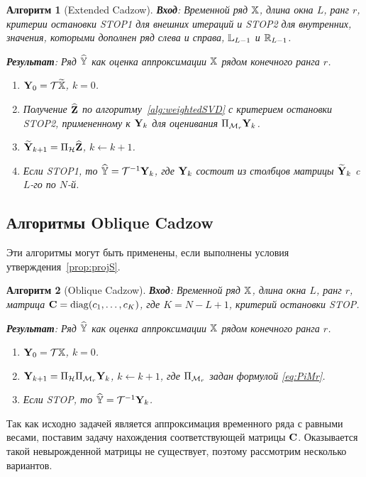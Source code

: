\documentclass[12pt,a4paper,fleqn,leqno]{article}
\newtheorem{algorithm}{Алгоритм}%
\begin{document}
\begin{algorithm}[Extended Cadzow]
\textbf{Вход}: Временной ряд $\mathbb{X}$, длина окна $L$, ранг $r$,
критерии остановки STOP1 для внешних итераций и STOP2 для внутренних,
значения, которыми дополнен ряд слева и справа, $\mathbb{L}_{L-1}$ и $\mathbb{R}_{L-1}$.

\textbf{Результат}:
Ряд $\widehat{\mathbb{Y}}$ как оценка аппроксимации $\mathbb{X}$ рядом конечного ранга $r$.

\begin{enumerate}
\item
$\mathbf{Y}_0 = \mathcal{T} \widetilde{\mathbb{X}}$, $k=0$.
\item
Получение $\widehat{\mathbf{Z}}$ по алгоритму~\ref{alg:weightedSVD} с критерием остановки STOP2, примененному к $\mathbf{Y}_k$ для оценивания $\Pi_{\mathcal{M}_r} \mathbf{Y}_{k}$.
\item
$\widetilde{\mathbf{Y}}_{k+1} = \Pi_{\mathcal{H}}  \widehat{\mathbf{Z}}$, $k\leftarrow k+1$.
\item
Если STOP1, то $\widehat{\mathbb{Y}} = \mathcal{T}^{-1} \mathbf{Y}_k$, где $\mathbf{Y}_k$ состоит из столбцов матрицы $\widetilde{\mathbf{Y}}_{k}$
c $L$-го по $N$-й.
\end{enumerate}
\end{algorithm}

\subsection{Алгоритмы Oblique Cadzow}

Эти алгоритмы могут быть применены, если выполнены условия утверждения~\ref{prop:projS}.

\begin{algorithm}[Oblique Cadzow]
\label{alg:obliqueCadzow}
\textbf{Вход}: Временной ряд $\mathbb{X}$, длина окна $L$, ранг $r$, матрица $\mathbf{C}=\mathop{\mathrm{diag}}(c_1,\ldots, c_K)$, где $K=N-L+1$,
критерий остановки STOP.

\textbf{Результат}:
Ряд $\widehat{\mathbb{Y}}$ как оценка аппроксимации $\mathbb{X}$ рядом конечного ранга $r$.

\begin{enumerate}
\item
$\mathbf{Y}_0 = \mathcal{T} \mathbb{X}$, $k=0$.
\item
$\mathbf{Y}_{k+1} = \Pi_{\mathcal{H}}  \Pi_{\mathcal{M}_r} \mathbf{Y}_{k}$, $k\leftarrow k+1$, где
$\Pi_{\mathcal{M}_r}$ задан формулой \eqref{eq:PiMr}.
\item
Если STOP, то $\widehat{\mathbb{Y}} = \mathcal{T}^{-1} \mathbf{Y}_k$.
\end{enumerate}
\end{algorithm}


Так как исходно задачей является аппроксимация временного ряда с равными весами, поставим задачу нахождения соответствующей матрицы $\mathbf{C}$.
Оказывается такой невырожденной матрицы не существует, поэтому рассмотрим несколько вариантов.
\end{document}
